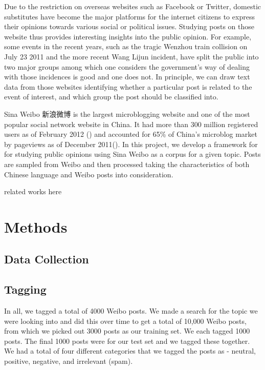 \documentclass[11pt]{article}
\newcommand{\1}[1]{{\mathbf 1}\left\{#1\right\}}        %
\begin{document}
Due to the restriction on overseas websites such as Facebook or Twitter, domestic substitutes have become the major platforms for the internet citizens to express their opinions towards various social or political issues. Studying posts on those website thus provides interesting insights into the public opinion. For example, some events in the recent years, such as the tragic Wenzhou train collision on July 23 2011
  and the more recent Wang Lijun incident,
have split the public into two major groups among which one considers the government's way of dealing with those incidences is good and one does not. 
In principle, we can draw text data from those websites identifying whether a particular post is related to the event of interest, and which group the post should be classified into.

Sina Weibo 新浪微博 is the largest microblogging website and one of the most popular social network website in China. It had more than 300 million registered users as of February 2012 (\cite{bloombergSina})
and accounted for 65\% of China's microblog market by pageviews as of December 2011(\cite{WashingtonPostSina}).
In this project, we develop a framework for for studying public opinions using Sina Weibo as a corpus for a given topic. Posts are sampled from Weibo and then processed taking the characteristics of both Chinese language and Weibo posts into consideration.


related works here 


\section{Methods}



\subsection{Data Collection}




\subsection{Tagging}


In all, we tagged a total of 4000 Weibo posts.  We made a search for the topic we were looking into and did this over time to get a total of 10,000 Weibo posts, from which we picked out 3000 posts as our training set.  We each tagged 1000 posts.  The final 1000 posts were for our test set and we tagged these together. We had a total of four different categories that we tagged the posts as - neutral, positive, negative, and irrelevant (spam).  
\end{document}
